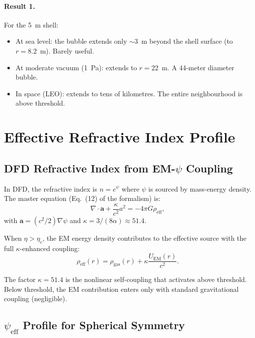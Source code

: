 \documentclass[amsmath,amssymb,aps,prd,superscriptaddress,nofootinbib]{revtex4-2}
\newcommand{\avec}{\mathbf{a}}
\newcommand{\ka}{\kappa}
\begin{document}
\paragraph{Result 1.} For the 5~m shell:
\begin{itemize}
\item At sea level: the bubble extends only $\sim 3$~m beyond the shell
  surface (to $r = 8.2$~m). Barely useful.
\item At moderate vacuum (1~Pa): extends to $r = 22$~m. A 44-meter
  diameter bubble.
\item In space (LEO): extends to tens of kilometres. The entire
  neighbourhood is above threshold.
\end{itemize}

\section{Effective Refractive Index Profile}\label{sec:n-eff}

\subsection{DFD Refractive Index from EM-$\psi$ Coupling}

In DFD, the refractive index is $n = e^\psi$ where $\psi$ is sourced by
mass-energy density. The master equation (Eq.~(12) of the formalism) is:
\begin{equation}\label{eq:master}
\nabla \cdot \avec + \frac{\ka}{c^2} a^2 = -4\pi G \rho_\text{eff},
\end{equation}
with $\avec = (c^2/2)\nabla\psi$ and $\ka = 3/(8\alpha) \approx 51.4$.

When $\eta > \eta_c$, the EM energy density contributes to the effective
source with the full $\kappa$-enhanced coupling:
\begin{equation}\label{eq:rho-eff}
\rho_\text{eff}(r) = \rho_\text{gas}(r) + \ka \frac{U_\text{EM}(r)}{c^2}.
\end{equation}

The factor $\kappa = 51.4$ is the nonlinear self-coupling that activates
above threshold. Below threshold, the EM contribution enters only with
standard gravitational coupling (negligible).

\subsection{$\psi_\text{eff}$ Profile for Spherical Symmetry}
\end{document}

